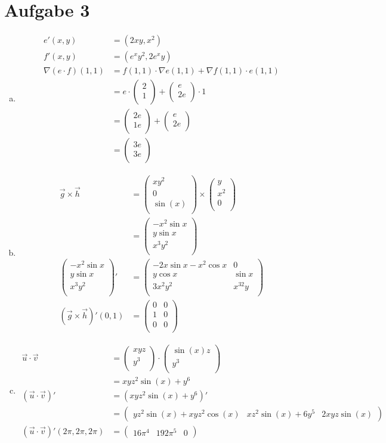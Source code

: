 \documentclass[10pt,a4paper,parskip=half]{scrartcl}
\newcommand{\vectwo}[2]{\begin{pmatrix}#1\\#2\\\end {pmatrix}}
\newcommand{\vecthree}[3]{\begin{pmatrix}#1\\#2\\#3\\\end {pmatrix}}
\begin{document}
\section*{Aufgabe 3}
\begin{enumerate}[(a)]
\item
\begin{align*}
e'(x,y) &= (2xy,x^2) \\
f'(x,y) &= (e^xy^2,2e^xy) \\
\nabla(e\cdot f)(1,1) &= f(1,1) \cdot \nabla e(1,1) + \nabla  f(1,1) \cdot e(1,1) \\
&= e \cdot \vectwo{2}{1} + \vectwo{e}{2e} \cdot 1 \\
&= \vectwo{2e}{1e} + \vectwo{e}{2e} \\
&= \vectwo{3e}{3e}
\end{align*}

\item
\begin{align*}
\vec g \times \vec h &= \vecthree{xy^2}{0}{\sin (x)} \times \vecthree{y}{x^2}{0} \\
&= \vecthree{-x^2 \sin x}{y\sin x}{x^3y^2} \\
\vecthree{-x^2 \sin x}{y \sin x}{x^3y^2}' &= 
\begin{pmatrix}
-2x \sin x - x^2 \cos x& 0 \\
y \cos x & \sin x \\
3x^2y^2 & x^32y\\
\end{pmatrix}\\
(\vec g \times \vec h)'(0,1) &= \begin{pmatrix}
0 & 0 \\
1 & 0 \\
0 & 0 \\
\end{pmatrix}
\end{align*}
\item
\begin{align*}
\vec u \cdot \vec v &= \vectwo{xyz}{y^3} \cdot \vectwo{\sin(x)z}{y^3} \\
&= xyz^2\sin(x) + y^6 \\
(\vec u \cdot \vec v)' &= (xyz^2\sin(x) + y^6)' \\
&= \begin{pmatrix}
yz^2\sin(x) + xyz^2\cos(x) & xz^2\sin(x) + 6y^5 & 2xyz\sin(x)
\end{pmatrix} \\
(\vec u \cdot \vec v)'(2\pi, 2\pi, 2\pi) &= \begin{pmatrix}16\pi^4 & 192\pi^5 & 0\end{pmatrix}
\end{align*}
\end{enumerate}
\end{document}
